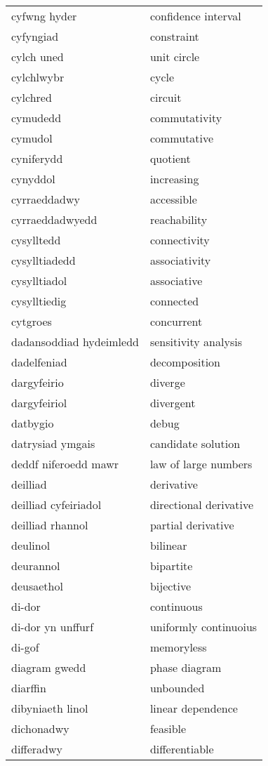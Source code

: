 \begin{supertabular}{p{0.22\textwidth}p{0.22\textwidth}}
cyfwng hyder & confidence interval \\
cyfyngiad & constraint \\
cylch uned & unit circle \\
cylchlwybr & cycle \\
cylchred & circuit \\
cymudedd & commutativity \\
cymudol & commutative \\
cyniferydd & quotient \\
cynyddol & increasing \\
cyrraeddadwy & accessible \\
cyrraeddadwyedd & reachability \\
cysylltedd & connectivity \\
cysylltiadedd & associativity \\
cysylltiadol & associative \\
cysylltiedig & connected \\
cytgroes & concurrent \\
dadansoddiad hydeimledd & sensitivity analysis \\
dadelfeniad & decomposition \\
dargyfeirio & diverge \\
dargyfeiriol & divergent \\
datbygio & debug \\
datrysiad ymgais & candidate solution \\
deddf niferoedd mawr & law of large numbers \\
deilliad & derivative \\
deilliad cyfeiriadol & directional derivative \\
deilliad rhannol & partial derivative \\
deulinol & bilinear \\
deurannol & bipartite \\
deusaethol & bijective \\
di-dor & continuous \\
di-dor yn unffurf & uniformly continuoius \\
di-gof & memoryless \\
diagram gwedd & phase diagram \\
diarffin & unbounded \\
dibyniaeth linol & linear dependence \\
dichonadwy & feasible \\
differadwy & differentiable \\

\end{supertabular}
